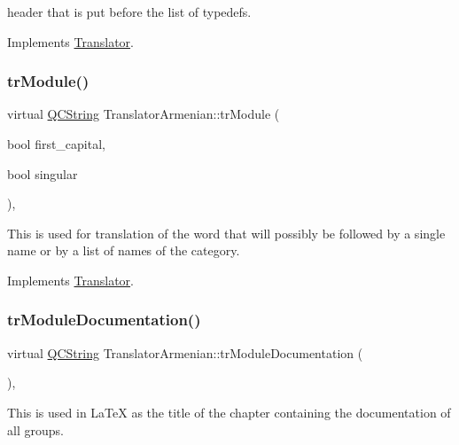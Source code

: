 header that is put before the list of typedefs. 

Implements \mbox{\hyperlink{class_translator}{Translator}}.

\mbox{\label{class_translator_armenian_a5828558ffacef1b51d2a7b40d00d9fc3}} 
\subsubsection{\texorpdfstring{trModule()}{trModule()}}
{\footnotesize\ttfamily virtual \mbox{\hyperlink{class_q_c_string}{Q\+C\+String}} Translator\+Armenian\+::tr\+Module (\begin{DoxyParamCaption}\item[{bool}]{first\+\_\+capital,  }\item[{bool}]{singular }\end{DoxyParamCaption})\hspace{0.3cm}{\ttfamily [inline]}, {\ttfamily [virtual]}}

This is used for translation of the word that will possibly be followed by a single name or by a list of names of the category. 

Implements \mbox{\hyperlink{class_translator}{Translator}}.

\mbox{\label{class_translator_armenian_a6584812fef135eb3813998a6679f9b52}} 
\subsubsection{\texorpdfstring{trModuleDocumentation()}{trModuleDocumentation()}}
{\footnotesize\ttfamily virtual \mbox{\hyperlink{class_q_c_string}{Q\+C\+String}} Translator\+Armenian\+::tr\+Module\+Documentation (\begin{DoxyParamCaption}{ }\end{DoxyParamCaption})\hspace{0.3cm}{\ttfamily [inline]}, {\ttfamily [virtual]}}

This is used in La\+TeX as the title of the chapter containing the documentation of all groups. 

